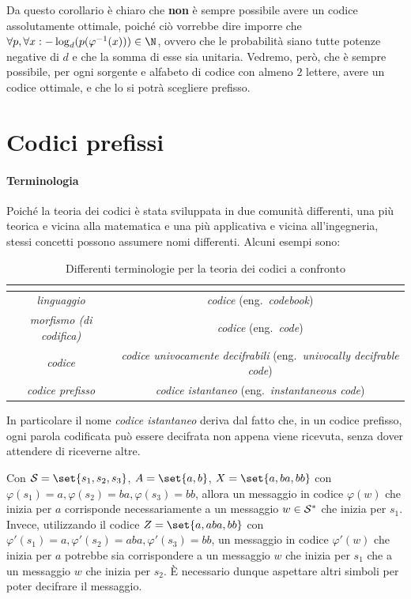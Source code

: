 Da questo corollario è chiaro che \textbf{non} è sempre possibile avere un codice assolutamente ottimale, poiché ciò vorrebbe dire imporre che \(\forall p, \forall x:-\log_d (p(\varphi^{-1}(x))) \in \N\), ovvero che le probabilità siano tutte potenze negative di \(d\) e che la somma di esse sia unitaria.
Vedremo, però, che è sempre possibile, per ogni sorgente e alfabeto di codice con almeno \(2\) lettere, avere un codice ottimale, e che lo si potrà scegliere prefisso.

\section{Codici prefissi}

\paragraph{Terminologia}
Poiché la teoria dei codici è stata sviluppata in due comunità differenti, una più teorica e vicina alla matematica e una più applicativa e vicina all'ingegneria, stessi concetti possono assumere nomi differenti.
Alcuni esempi sono:
\begin{table}[H]
\centering
\begin{tabular}{|c|c|}
\hline
\textbf{\q{Matematica}} & \textbf{\q{Ingegneria}} \\
\hline
\emph{linguaggio} & \emph{codice} (eng.\ \emph{codebook}) \\
\emph{morfismo (di codifica)} & \emph{codice} (eng.\ \emph{code}) \\
\emph{codice} & \emph{codice univocamente decifrabili} (eng.\ \emph{univocally decifrable code}) \\
\emph{codice prefisso} & \emph{codice istantaneo} (eng.\ \emph{instantaneous code}) \\
\hline
\end{tabular}
\caption{Differenti terminologie per la teoria dei codici a confronto}\label{tab:code_theory_terms}
\end{table}

In particolare il nome \emph{codice istantaneo} deriva dal fatto che, in un codice prefisso, ogni parola codificata può essere decifrata non appena viene ricevuta, senza dover attendere di riceverne altre.

\begin{example}{}
  Con \(\SCal = \set{s_1,s_2,s_3}\), \(A = \set{a,b}\), \(X = \set{a,ba,bb}\) con \(\varphi(s_1) = a, \varphi(s_2) = ba, \varphi(s_3) = bb\), allora un messaggio in codice \(\varphi(w)\) che inizia per \(a\) corrisponde necessariamente a un messaggio \(w \in \mathcal{S}^*\) che inizia per \(s_1\).
  Invece, utilizzando il codice \(Z = \set{a,aba,bb}\) con \(\varphi'(s_1) = a, \varphi'(s_2) = aba, \varphi'(s_3) = bb\), un messaggio in codice \(\varphi'(w)\) che inizia per \(a\) potrebbe sia corrispondere a un messaggio \(w\) che inizia per \(s_1\) che a un messaggio \(w\) che inizia per \(s_2\).
  È necessario dunque aspettare altri simboli per poter decifrare il messaggio.
\end{example}

